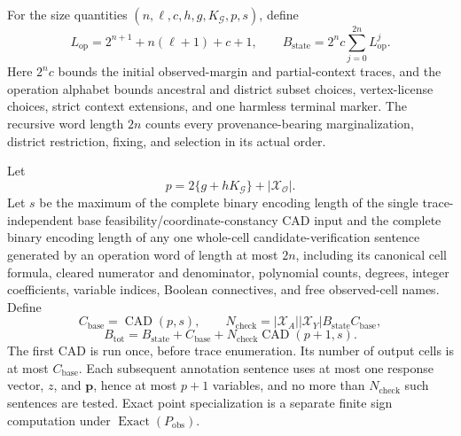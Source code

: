 For the size quantities \((n,\ell,c,h,g,K_{\mathcal G},p,s)\), define
\[
L_{\mathrm{op}}=2^{n+1}+n(\ell+1)+c+1,
\qquad
B_{\mathrm{state}}=2^n c\sum_{j=0}^{2n}L_{\mathrm{op}}^j.
\]
Here \(2^n c\) bounds the initial observed-margin and partial-context traces, and the operation alphabet bounds ancestral and district subset choices, vertex-license choices, strict context extensions, and one harmless terminal marker. The recursive word length \(2n\) counts every provenance-bearing marginalization, district restriction, fixing, and selection in its actual order.

Let
\[
p=2\{g+hK_{\mathcal G}\}+|\mathcal X_{\mathcal O}|.
\]
Let \(s\) be the maximum of the complete binary encoding length of the single trace-independent base feasibility/coordinate-constancy CAD input and the complete binary encoding length of any one whole-cell candidate-verification sentence generated by an operation word of length at most \(2n\), including its canonical cell formula, cleared numerator and denominator, polynomial counts, degrees, integer coefficients, variable indices, Boolean connectives, and free observed-cell names. Define
\[
C_{\mathrm{base}}=\operatorname{CAD}(p,s),
\qquad
N_{\mathrm{check}}=|\mathcal X_A||\mathcal X_Y|B_{\mathrm{state}}C_{\mathrm{base}},
\]
\[
B_{\mathrm{tot}}=
B_{\mathrm{state}}+C_{\mathrm{base}}
+N_{\mathrm{check}}\operatorname{CAD}(p+1,s).
\]
The first CAD is run once, before trace enumeration. Its number of output cells is at most \(C_{\mathrm{base}}\). Each subsequent annotation sentence uses at most one response vector, \(z\), and \(\mathbf p\), hence at most \(p+1\) variables, and no more than \(N_{\mathrm{check}}\) such sentences are tested. Exact point specialization is a separate finite sign computation under \(\operatorname{Exact}(P_{\mathrm{obs}})\).